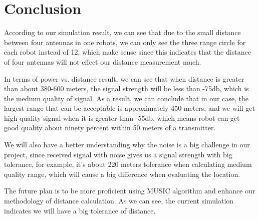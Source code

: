 \section{Conclusion}
\indent 
	According to our simulation result, we can see that due to the small distance between four antennas in one robots, we can only see the three range circle for each robot instead of 12, which make sense since this indicates that the distance of four antennas will not effect our distance measurement much. 
	\par
	In terms of power vs. distance result, we can see that when distance is greater than about 380-600 meters, the signal strength will be less than -75db, which is the medium quality of signal. As a result, we can conclude that in our case, the largest range that can be acceptable is approximately 450 meters, and we will get high quality signal when it is greater than -55db, which means robot can get good quality about ninety percent within 50 meters of a transmitter.
	\par
	We will also have a better understanding why the noise is a big challenge in our project, since received signal with noise gives us a signal strength with big tolerance, for example, it's about 220 meters tolerance when calculating medium quality range, which will cause a big difference when evaluating the location.
\par
	The future plan is to be more proficient using MUSIC algorithm and enhance our methodology of distance calculation. As we can see, the current simulation indicates we will have a big tolerance of distance. \cite{speedguide}


